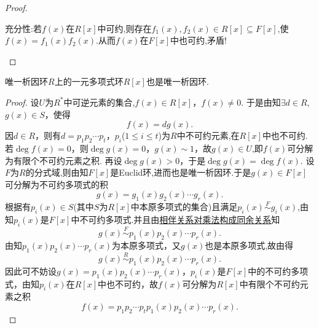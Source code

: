 \documentclass[../../main.tex]{subfiles}%
\begin{document}
\begin{proof}
\begin{enumerate}[(1)]
{\heiti 充分性:}若$f(x)$在$R[x]$中可约,则存在$f_1(x),f_2(x)\in R[x]\subseteq F[x]$,使$f(x)=f_1(x)f_2(x)$.从而$f(x)$在$F[x]$中也可约,矛盾!
\end{enumerate}
\end{proof}

\begin{theorem}\label{theorem:抽象代数--定理2.7.3}
唯一析因环$R$上的一元多项式环$R[x]$也是唯一析因环.
\end{theorem}
\begin{proof}

设$U$为$R^*$中可逆元素的集合,$f(x) \in R[x]$，$f(x) \neq 0$. 于是由知$\exists d \in R$,$g(x) \in S$，使得
\[
f(x) = dg(x).
\]
因$d \in R$，则有$d = p_1p_2\cdots p_t$，$p_i$($1 \leqslant i \leqslant t$)为$R$中不可约元素,在$R[x]$中也不可约. 若$\deg f(x) = 0$，则$\deg g(x) = 0$，$g(x) \sim 1$，故$g(x)\in U$,即$f(x)$可分解为有限个不可约元素之积. 再设$\deg g(x) > 0$，于是$\deg g(x) = \deg f(x)$. 设$F$为$R$的分式域,则由知$F[x]$是Euclid环,进而也是唯一析因环.于是$g(x) \in F[x]$可分解为不可约多项式的积
\[
g(x) = g_1(x)g_2(x)\cdots g_r(x).
\]
根据有$p_i(x) \in S$(其中$S$为$R[x]$中本原多项式的集合)且满足$p_i(x) \stackrel{F}{\sim} g_i(x)$,由知$p_i(x)$是$F[x]$中不可约多项式.并且由\hyperref[theorem:单位群整除的基本性质-8]{相伴关系对乘法构成同余关系}知
\[
g(x) \stackrel{F}{\sim} p_1(x)p_2(x)\cdots p_r(x).
\]
由知$p_1(x)p_2(x)\cdots p_r(x)$为本原多项式，又$g(x)$也是本原多项式,故由得
\[
g(x) \stackrel{R}{\sim} p_1(x)p_2(x)\cdots p_r(x).
\]
因此可不妨设$g(x) = p_1(x)p_2(x)\cdots p_r(x)$，$p_i(x)$是$F[x]$中的不可约多项式，由知$p_i(x)$在$R[x]$中也不可约，故$f(x)$可分解为$R[x]$中有限个不可约元素之积
\[
f(x) = p_1p_2\cdots p_tp_1(x)p_2(x)\cdots p_r(x).
\]


\end{proof}
\end{document}
